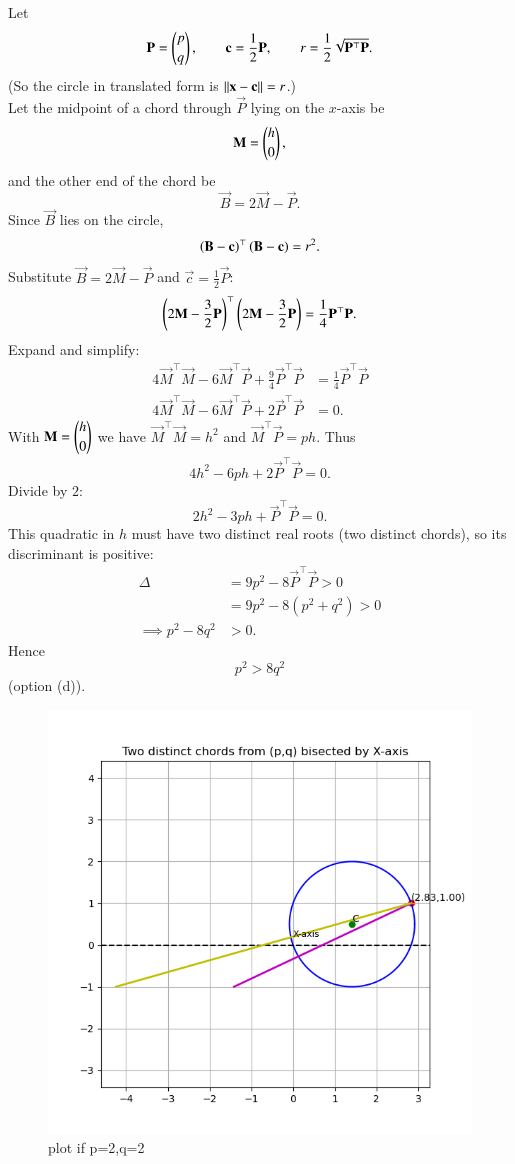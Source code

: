 \documentclass[journal]{IEEEtran}
\begin{document}
\solution \\
Let
\begin{equation}
\mathbf{P}=\begin{pmatrix}p\\[2pt] q\end{pmatrix},\qquad \mathbf{c}=\frac{1}{2}\mathbf{P},\qquad r=\frac{1}{2}\sqrt{\mathbf{P}^\top\mathbf{P}}.
\end{equation}
(So the circle in translated form is \(\left\lVert\mathbf{x}-\mathbf{c}\right\rVert=r\).)\\
Let the midpoint of a chord through \(\vec{P}\) lying on the \(x\)-axis be
\begin{equation}
\mathbf{M}=\begin{pmatrix}h\\[2pt]0\end{pmatrix},
\end{equation}
and the other end of the chord be
\begin{equation}
\vec{B}=2\vec{M}-\vec{P}.
\end{equation}
Since \(\vec{B}\) lies on the circle,
\begin{equation}
\left(\mathbf{B}-\mathbf{c}\right)^\top\left(\mathbf{B}-\mathbf{c}\right)=r^2.
\end{equation}
Substitute \(\vec{B}=2\vec{M}-\vec{P}\) and \(\vec{c}=\frac12\vec{P}\):
\begin{equation}
\left(2\mathbf{M}-\frac{3}{2}\mathbf{P}\right)^\top\left(2\mathbf{M}-\frac{3}{2}\mathbf{P}\right)=\frac{1}{4}\mathbf{P}^\top\mathbf{P}.
\end{equation}
Expand and simplify:
\begin{align}
4\vec{M}^\top\vec{M}-6\vec{M}^\top\vec{P}+\frac{9}{4}\vec{P}^\top\vec{P}
&= \frac{1}{4}\vec{P}^\top\vec{P} \\[2pt]
4\vec{M}^\top\vec{M}-6\vec{M}^\top\vec{P}+2\vec{P}^\top\vec{P} &= 0.
\end{align}
With \(\mathbf{M}=\begin{pmatrix}h\\[2pt]0\end{pmatrix}\) we have \(\vec{M}^\top\vec{M}=h^2\) and \(\vec{M}^\top\vec{P}=ph\). Thus
\[
4h^2-6ph+2\vec{P}^\top\vec{P}=0.
\]
Divide by \(2\):
\[
2h^2-3ph+\vec{P}^\top\vec{P}=0.
\]
This quadratic in \(h\) must have two distinct real roots (two distinct chords), so its discriminant is positive:
\begin{align}
\Delta &= 9p^2 - 8\vec{P}^\top\vec{P} > 0 \\[2pt]
&= 9p^2 - 8(p^2+q^2) > 0 \\[2pt]
\implies p^2 - 8q^2 &> 0.
\end{align}
Hence
\[
\boxed{\,p^2>8q^2\,}
\]
(option (d)).

 \begin{figure}[H]
     \centering
     \includegraphics[width=0.8\columnwidth]{figs/14.png}
     \caption{plot if p=2,q=2}
     \label{fig:1}
 \end{figure}
\end{document}
